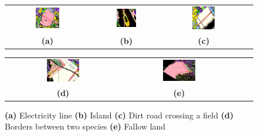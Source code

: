 \documentclass{siamart171218}
\begin{document}
\begin{figure} [H]
    \centering
    \begin{tabular}{cccc}
        \includegraphics[width=0.3\textwidth]{images/electric_line_field.png} &
        \includegraphics[width=0.3\textwidth]{images/island.png} &
        \includegraphics[width=0.3\textwidth]{images/dirt_road.png} \\
        \textbf{(a)}  & \textbf{(b)} & \textbf{(c)}  \\[6pt]
    \end{tabular}
    \begin{tabular}{cccc}
        \includegraphics[width=0.3\textwidth]{images/borders.png} &
        \includegraphics[width=0.3\textwidth]{images/field.png} \\
        \textbf{(d)}  & \textbf{(e)}  \\[6pt]
    \end{tabular}
    \caption{ \textbf{(a)} Electricity line
    \textbf{(b)} Island
    \textbf{(c)} Dirt road crossing a field
    \textbf{(d)} Borders between two species
    \textbf{(e)} Fallow land}
    \label{to_be_rejected}
\end{figure}
\end{document}
